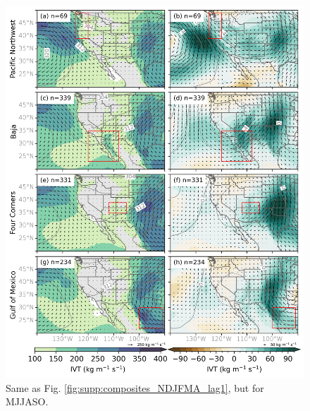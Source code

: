 \documentclass[jgrga]{agutexSI2019}
\begin{document}
\begin{article}
\begin{figure}
\noindent\includegraphics[scale=0.8]{figS6.png}
\caption{Same as Fig. \ref{fig:supp:composites_NDJFMA_lag1}, but for MJJASO.}
\label{fig:supp:composites_MJJASO_lag1}
\end{figure}
\clearpage


\end{article}
\end{document}
